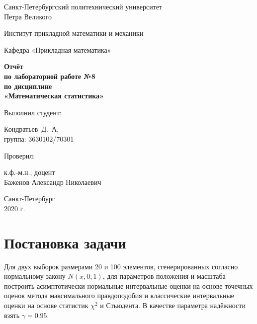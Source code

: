 \documentclass[12pt,a4paper]{article}
\begin{document}
	\begin{titlepage}
		\begin{center}			
			Санкт-Петербургский политехнический университет\\
			Петра Великого
			\vspace{0.25cm}
			
			Институт прикладной математики и механики
			
			Кафедра «Прикладная математика»
			\vfill
			
			\textbf{Отчёт\\
				по лабораторной работе №8\\
				по дисциплине\\
				«Математическая статистика»}\\[5mm]
			\bigskip
		\end{center}
		\vfill
		
		\hfill\begin{minipage}{0.45\textwidth}
			Выполнил студент:
			\vspace{0.2cm}
			
			Кондратьев~Д.~А.\\
			группа: 3630102/70301
		\end{minipage}%
		\bigskip
		
		\hfill\begin{minipage}{0.45\textwidth}
			Проверил:
			\vspace{0.2cm}
			
			к.ф.-м.н., доцент\\
			Баженов Александр Николаевич
		\end{minipage}%
		\vfill
		
		\begin{center}
			Санкт-Петербург\\
			2020 г.
		\end{center}
	\end{titlepage}
	
	
	
	\tableofcontents{}
	\listoftables
	
	\newpage
	\section{Постановка задачи}
		Для двух выборок размерами 20 и 100 элементов, сгенерированных согласно нормальному закону $N(x, 0, 1)$, для параметров положения и масштаба построить асимптотически нормальные интервальные оценки на основе точечных оценок метода максимального правдоподобия и классические интервальные оценки на основе статистик $\chi^2$ и Стьюдента. В качестве параметра надёжности взять $\gamma = 0.95$.
	
\end{document}
